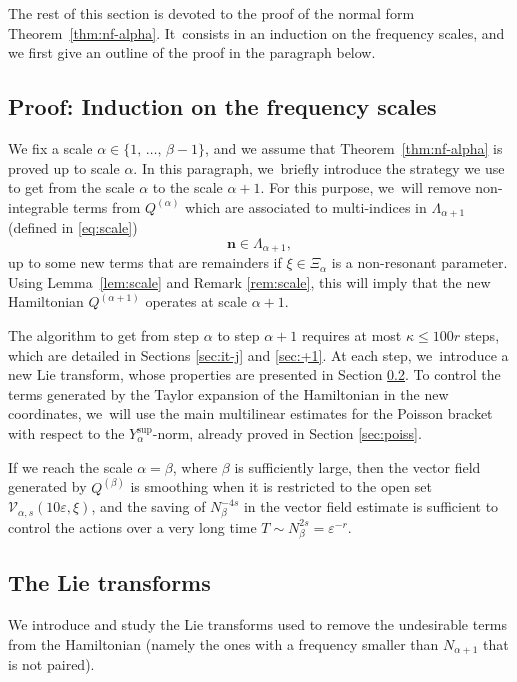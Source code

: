 \documentclass[10pt,a4paper]{amsart}
\theoremstyle{plain}
\theoremstyle{definition}
\newcommand{\nb}{{\boldsymbol n}}
\newcommand{\1}{\mathbf{1}}
\newcommand{\Ysup}[1]{Y_{#1}^{\mathrm{sup}}}
\let\epsilon\varepsilon
\begin{document}
The rest of this section is devoted to the proof of the normal form Theorem~\ref{thm:nf-alpha}. It~consists in an induction on the frequency scales, and we first give an outline of the proof in the paragraph below.

\subsection{Proof: Induction on the frequency scales}
\label{sec:proof-nf}
We fix a scale $\alpha\in\{1,\,\dots,\,\beta-1\}$, and we assume that Theorem~\ref{thm:nf-alpha} is proved up to scale $\alpha$. In this paragraph, we~briefly introduce the strategy we use to get from the scale $\alpha$ to the scale $\alpha+1$. For this purpose, we~will remove non-integrable terms from $Q^{(\alpha)}$ which are associated to multi-indices in $\Lambda_{\alpha+1}$ (defined in \eqref{eq:scale})
\[
\nb\in\Lambda_{\alpha+1},
\]
up to some new terms that are remainders if $\xi\in\Xi_{\alpha}$ is a non-resonant parameter. Using Lemma~\ref{lem:scale} and Remark \ref{rem:scale}, this will imply that the new Hamiltonian
$Q^{(\alpha+1)}$ operates at scale $\alpha+1$.

The algorithm to get from step $\alpha$ to step $\alpha+1$ requires at most $\kappa\leq 100r$ steps, which are detailed in Sections \ref{sec:it-j} and \ref{sec:+1}. At each step, we~introduce a new Lie transform, whose properties are presented in Section \ref{sec:lie}. To control the terms generated by the Taylor expansion of the Hamiltonian in the new coordinates, we~will use the main multilinear estimates for the Poisson bracket with respect to the $\Ysup{\alpha}$-norm, already proved in Section \ref{sec:poiss}.

If we reach the scale $\alpha=\beta$, where $\beta$ is sufficiently large, then the vector field generated by $Q^{(\beta)}$ is smoothing when it is restricted to the open set $\mathcal{V}_{\alpha,s}(10\epsilon,\xi)$, and the saving of $N_{\beta}^{-4s}$ in the vector field estimate is sufficient to control the actions over a very long time $T\sim N_{\beta}^{2s}=\epsilon^{-r}$.

\subsection{The Lie transforms}
\label{sec:lie}
We introduce and study the Lie transforms used to remove the undesirable terms from the Hamiltonian (namely the ones with a frequency smaller than $N_{\alpha+1}$ that is not paired).
\end{document}
